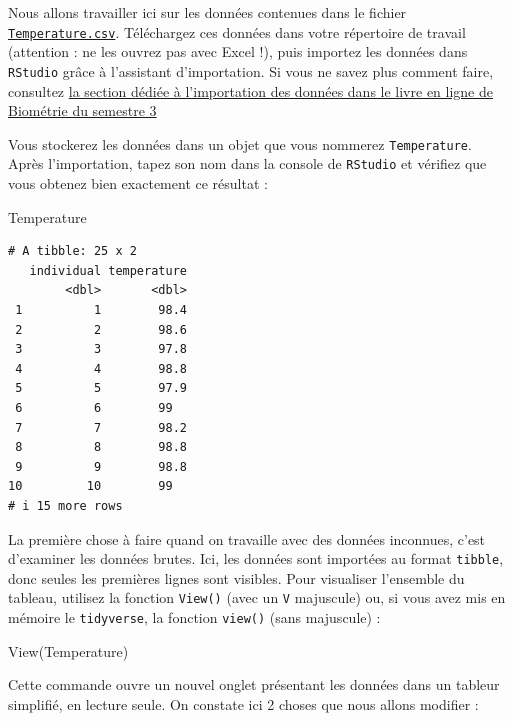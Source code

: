 \documentclass[
  a4paper,
  DIV=11,
  numbers=noendperiod,
  oneside]{scrreprt}
\newenvironment{Shaded}{}{}
\newcommand{\FunctionTok}[1]{\textcolor[rgb]{0.44,0.26,0.76}{#1}}
\newcommand{\NormalTok}[1]{\textcolor[rgb]{0.14,0.16,0.18}{#1}}
\begin{document}
Nous allons travailler ici sur les données contenues dans le fichier
\href{data/Temperature.csv}{\texttt{Temperature.csv}}. Téléchargez ces
données dans votre répertoire de travail (attention : ne les ouvrez pas
avec Excel !), puis importez les données dans \texttt{RStudio} grâce à
l'assistant d'importation. Si vous ne savez plus comment faire,
consultez
\href{https://besibo.github.io/BiometrieS3/04-DataWrangling.html\#plaintext}{la
section dédiée à l'importation des données dans le livre en ligne de
Biométrie du semestre 3}

Vous stockerez les données dans un objet que vous nommerez
\texttt{Temperature}. Après l'importation, tapez son nom dans la console
de \texttt{RStudio} et vérifiez que vous obtenez bien exactement ce
résultat :

\begin{Shaded}
\begin{Highlighting}[]
\NormalTok{Temperature}
\end{Highlighting}
\end{Shaded}

\begin{verbatim}
# A tibble: 25 x 2
   individual temperature
        <dbl>       <dbl>
 1          1        98.4
 2          2        98.6
 3          3        97.8
 4          4        98.8
 5          5        97.9
 6          6        99  
 7          7        98.2
 8          8        98.8
 9          9        98.8
10         10        99  
# i 15 more rows
\end{verbatim}

La première chose à faire quand on travaille avec des données inconnues,
c'est d'examiner les données brutes. Ici, les données sont importées au
format \texttt{tibble}, donc seules les premières lignes sont visibles.
Pour visualiser l'ensemble du tableau, utilisez la fonction
\texttt{View()} (avec un \texttt{V} majuscule) ou, si vous avez mis en
mémoire le \texttt{tidyverse}, la fonction \texttt{view()} (sans
majuscule) :

\begin{Shaded}
\begin{Highlighting}[]
\FunctionTok{View}\NormalTok{(Temperature)}
\end{Highlighting}
\end{Shaded}

Cette commande ouvre un nouvel onglet présentant les données dans un
tableur simplifié, en lecture seule. On constate ici 2 choses que nous
allons modifier :
\end{document}

